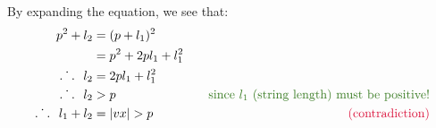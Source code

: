 \begin{problem}
\begin{enumalph}
\begin{Answer}
\begin{enumroman}
\begin{itemize}
              \step
              By expanding the equation, we see that:
              \begin{align*}
                p^2 + l_2 &= (p + l_1)^2 \\
                          &= p^2 + 2pl_1 + l_1^2 \\
                \Therefore l_2 &= 2pl_1 + l_1^2 \\
                \Therefore l_2 &> p \quad & \quad \green{\text{since $l_1$ (string length) must be positive!}} \\
                \Therefore l_1 + l_2 &= \abs{vx} > p &\crim{\text{(contradiction)}}
              \end{align*}
          \end{itemize}



      \end{enumroman}
    \end{Answer}
  \end{enumalph}
\end{problem}
